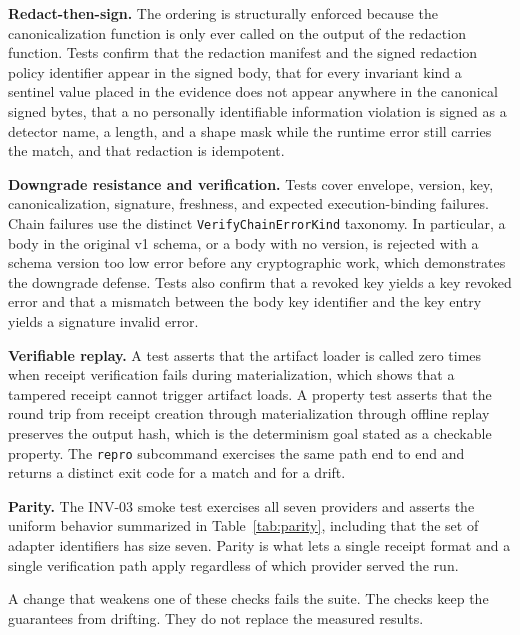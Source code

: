 \documentclass[conference]{IEEEtran}
\newcommand{\code}[1]{\texttt{\small #1}}
\begin{document}
\textbf{Redact-then-sign.} The ordering is structurally enforced because the
canonicalization function is only ever called on the output of the redaction function.
Tests confirm that the redaction manifest and the signed redaction policy identifier
appear in the signed body, that for every invariant kind a sentinel value placed in
the evidence does not appear anywhere in the canonical signed bytes, that a no
personally identifiable information violation is signed as a detector name, a length,
and a shape mask while the runtime error still carries the match, and that redaction
is idempotent.

\textbf{Downgrade resistance and verification.} Tests cover envelope, version, key,
canonicalization, signature, freshness, and expected execution-binding failures.
Chain failures use the distinct \code{VerifyChainErrorKind} taxonomy. In particular, a body in the original v1 schema, or a body with no
version, is rejected with a schema version too low error before any cryptographic work,
which demonstrates the downgrade defense. Tests also confirm that a revoked key yields
a key revoked error and that a mismatch between the body key identifier and the key
entry yields a signature invalid error.

\textbf{Verifiable replay.} A test asserts that the artifact loader is called zero
times when receipt verification fails during materialization, which shows that a
tampered receipt cannot trigger artifact loads. A property test asserts that the round
trip from receipt creation through materialization through offline replay preserves the
output hash, which is the determinism goal stated as a checkable property. The
\code{repro} subcommand exercises the same path end to end and returns a distinct exit
code for a match and for a drift.

\textbf{Parity.} The INV-03 smoke test exercises all seven providers and asserts the
uniform behavior summarized in Table~\ref{tab:parity}, including that the set of
adapter identifiers has size seven. Parity is what lets a single receipt format and a
single verification path apply regardless of which provider served the run.

A change that weakens one of these checks fails the suite. The checks keep the
guarantees from drifting. They do not replace the measured results.



\end{document}
